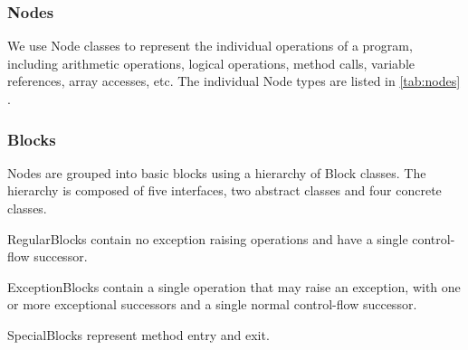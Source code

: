 \subsubsection{Nodes}
\label{sec:node_classes}

    We use Node classes to represent the individual operations of a program, including arithmetic operations, logical operations, method calls, variable references, array accesses, etc.  The individual Node types are listed in \autoref{tab:nodes} .


\subsubsection{Blocks}
\label{sec:block_classes}

    Nodes are grouped into basic blocks using a hierarchy of Block classes.  The hierarchy is composed of five interfaces, two abstract classes and four concrete classes.  

    



    RegularBlocks contain no exception raising operations and have a single control-flow successor.

        
        
    ExceptionBlocks contain a single operation that may raise an exception, with one or more exceptional successors and a single normal control-flow successor.
            

        
    SpecialBlocks represent method entry and exit.

